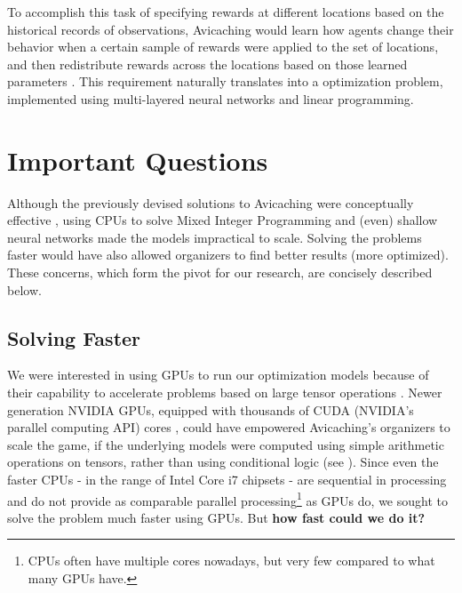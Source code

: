 To accomplish this task of specifying rewards at different locations based on the historical records of observations, Avicaching would learn how agents change their behavior when a certain sample of rewards were applied to the set of locations, and then redistribute rewards across the locations based on those learned parameters \cite{Xue2016Avi2}. This requirement naturally translates into a  optimization problem, implemented using multi-layered neural networks and linear programming.

\section{Important Questions} \label{sec:Important Questions}
Although the previously devised solutions to Avicaching were conceptually effective \cite{Xue2016Avi1, Xue2016Avi2}, using CPUs to solve Mixed Integer Programming and (even) shallow neural networks made the models impractical to scale. Solving the problems faster would have also allowed organizers to find better results (more optimized). These concerns, which form the pivot for our research, are concisely described below.

\subsection{Solving Faster} \label{sec:Important Questions - Solving Faster}
We were interested in using GPUs to run our optimization models because of their capability to accelerate problems based on large tensor operations \cite{ParallelNVIDIA, cuDNNPaper}. Newer generation NVIDIA GPUs, equipped with thousands of CUDA (NVIDIA's parallel computing API) cores \cite{NVIDIA}, could have empowered Avicaching's organizers to scale the game, if the underlying models were computed using simple arithmetic operations on tensors, rather than using conditional logic (see ). Since even the faster CPUs - in the range of Intel Core i7 chipsets - are sequential in processing and do not provide as comparable parallel processing\footnote{CPUs often have multiple cores nowadays, but very few compared to what many GPUs have.} as GPUs do, we sought to solve the problem much faster using GPUs. But \textbf{how fast could we do it?}

